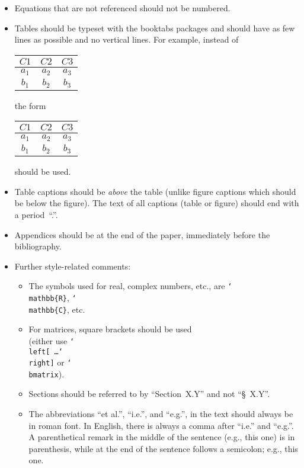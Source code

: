 \documentclass[parskip]{scrartcl}
\begin{document}
\begin{itemize}
\item Equations that are not referenced should not be numbered.
%
\item Tables should be typeset with the booktabs packages and should have as few lines as possible and no vertical lines.
For example, instead of
\begin{center}
  \begin{tabular}{|c|c|c|}\hline
  $C1$ & $C2$ & $C3$ \\ \hline
  $a_1$ & $a_2$ & $a_3$ \\ \hline
  $b_1$ & $b_2$ & $b_3$ \\ \hline
  \end{tabular}
\end{center}
the form
\begin{center}
  \begin{tabular}{ccc}\toprule
  $C1$ & $C2$ & $C3$ \\ \midrule
  $a_1$ & $a_2$ & $a_3$ \\
  $b_1$ & $b_2$ & $b_3$\\
  \bottomrule
  \end{tabular}
\end{center}
should be used.
\item Table captions should be \emph{above} the table (unlike figure captions
  which should be below the figure). The text of all captions (table or figure)
  should end with a period~``.''.

\item Appendices should be at the end of the paper, immediately before the
bibliography.

\item Further style-related comments:
\begin{itemize}
\item The symbols used for real, complex numbers, etc.,
are \texttt{{\char`\\mathbb\{R\}}}, \texttt{{\char`\\mathbb\{C\}}}, etc.
%
\item For matrices, square brackets should be used \\
(either use
\texttt{\char`\\left[ \dots \char`\\right]} or \texttt{\char`\\bmatrix}).
%
\item Sections should be referred to by ``Section~X.Y'' and not ``\S~X.Y''.
%
\item The abbreviations ``et al.'', ``i.e.'', and ``e.g.'', in the text
should always be in roman font.
In English, there is always a comma after ``i.e.'' and ``e.g.''.
%
A parenthetical remark in the middle of the sentence (e.g., this one) is in
parenthesis, while at the end of the sentence follows a semicolon; e.g., this
one.
%
\end{itemize}
\end{itemize}
\end{document}
